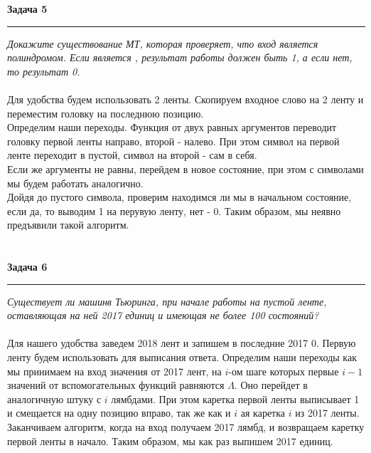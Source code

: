 \documentclass[a4paper,11pt]{article}
\begin{document}




\textbf{\large Задача 5}
\medskip\hrule\medskip
\textit{Докажите существование МТ, которая проверяет, что вход является полиндромом. Если является , результат работы должен быть 1, а если нет, то результат 0.} \\ \\

Для удобства будем использовать 2 ленты. Скопируем входное слово на 2 ленту и переместим головку на последнюю позицию.  \\[2pt]
Определим наши переходы. Функция от двух равных аргументов переводит головку первой ленты направо, второй - налево. При этом символ на первой ленте переходит в пустой, символ на второй - сам в себя. \\[2pt] 
Если же аргументы не равны, перейдем в новое состояние, при этом  с символами мы будем работать аналогично. \\[2pt]
Дойдя до пустого символа, проверим находимся ли мы в начальном состояние, если да, то выводим 1 на перувую ленту, нет - 0. Таким образом, мы неявно предъявили такой алгоритм.
\\ \\ \\








\textbf{\large Задача 6}
\medskip\hrule\medskip
\textit{Существует ли машинв Тьюринга, при начале работы на пустой ленте, оставляющая на ней 2017 единиц и имеющая не более 100 состояний?} \\ \\

Для нашего удобства заведем 2018 лент и запишем в последние 2017 0. Первую ленту будем использовать для выписания ответа. Определим наши переходы как мы принимаем на вход значения от 2017 лент, на $ i $-ом шаге которых первые $ i - 1 $ значений от  вспомогательных функций равняются $ \Lambda $. Оно перейдет в аналогичную штуку с $ i $ лямбдами. При этом каретка первой ленты выписывает 1 и смещается на одну позицию вправо, так же как и $ i $ ая каретка $ i $ из 2017 ленты. Заканчиваем алгоритм, когда на вход получаем 2017 лямбд, и возвращаем каретку первой ленты в начало. Таким образом, мы как раз выпишем 2017 единиц.
\\ \\ \\
\end{document}
